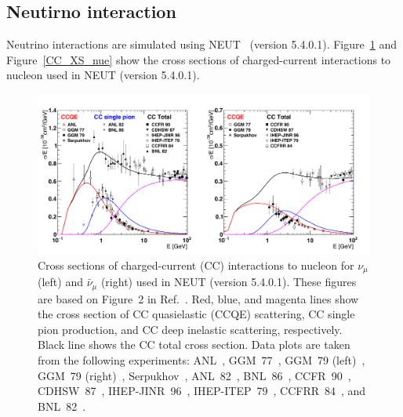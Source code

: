 \subsection{Neutirno interaction}\label{Subsec_neutrino_int}
\vs\hs
Neutrino interactions are simulated using NEUT~\cite{2021Hayato} (version 5.4.0.1).
Figure~\ref{CC_XS_numu} and Figure~\ref{CC_XS_nue} show the cross sections of charged-current interactions to nucleon used in NEUT (version 5.4.0.1).

\begin{figure}[tbp]
	\centering
	\includegraphics[width=16cm]{Figures/Simulation/CC_XS_numu}
	\caption[Cross sections of charged-current interactions to nucleon for $\nu_{\mu}$ and $\bar{\nu}_{\mu}$ used in NEUT (version 5.4.0.1)]{
	Cross sections of charged-current (CC) interactions to nucleon for $\nu_{\mu}$ (left) and $\bar{\nu}_{\mu}$ (right) used in NEUT (version 5.4.0.1).
	These figures are based on Figure~2 in Ref.~\cite{2020Koshio}.
	Red, blue, and magenta lines show the cross section of CC quasielastic (CCQE) scattering, CC single pion production, and CC deep inelastic scattering, respectively.
	Black line shows the CC total cross section.
	Data plots are taken from the following experiments:
	ANL~\cite{1977Barish}, GGM~77~\cite{1977Bonetti}, GGM~79 (left)~\cite{1979Ciampolillo}, GGM~79 (right)~\cite{1979Armenise}, Serpukhov~\cite{1985Belikov},
	ANL~82~\cite{1982Radecky}, BNL~86~\cite{1986Kitagaki},
	CCFR~90~\cite{1990Auchincloss}, CDHSW~87~\cite{1987Berge}, IHEP-JINR~96~\cite{1996Anikeev}, IHEP-ITEP~79~\cite{1979Mukhin}, CCFRR~84~\cite{1984MacFarlane}, and BNL~82~\cite{1982Baker}.
	}\label{CC_XS_numu}
\end{figure}

